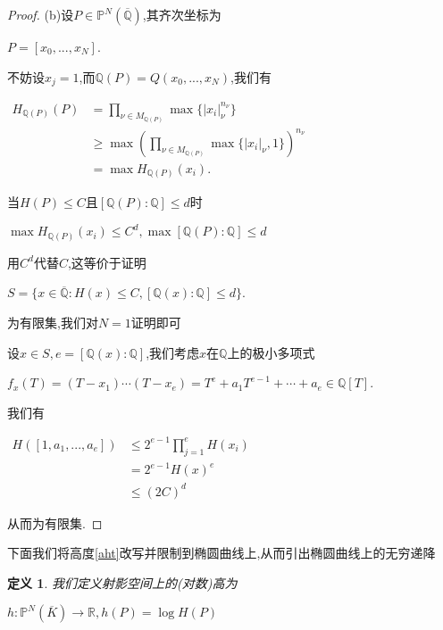 \documentclass[11pt]{ctexart}
\DeclareMathOperator{\Max}{max}
\DeclareMathOperator{\Log}{log}
\newtheorem{defi}{定义}[section]
\begin{document}
\begin{proof}
\noindent (b)设$P \in \mathbb{P}^N(\overline{\mathbb{Q}})$,其齐次坐标为
\begin{center}
    $P=[x_0,...,x_N]$.
\end{center}
不妨设$x_j=1$,而$\mathbb{Q}(P)=Q(x_0,...,x_N)$,我们有
\begin{center}
$\begin{array}{cl}
    H_{\mathbb{Q}(P)}(P)&=\prod\limits_{\nu \in M_{\mathbb{Q}(P)}}\Max \{|x_i|_{\nu}^{n_{\nu}}\}\\

    &\geq\Max (\prod\limits_{\nu \in M_{\mathbb{Q}(P)}}\Max \{|x_i|_{\nu},1\})^{n_{\nu}}\\

    &=\Max H_{\mathbb{Q}(P)}(x_i).
\end{array}$
\end{center}
当$H(P)\leq C$且$[\mathbb{Q}(P):\mathbb{Q}]\leq d$时
\begin{center}
    $\Max H_{\mathbb{Q}(P)}(x_i)\leq C^d$$,\Max  [\mathbb{Q}(P):\mathbb{Q}]\leq d$
\end{center}
用$C^d$代替$C$,这等价于证明
\begin{center}
    $S=\{x\in \overline{\mathbb{Q}}:H(x)\leq C,[\mathbb{Q}(x):\mathbb{Q}]\leq d\}$.
\end{center}
为有限集,我们对$N=1$证明即可
 
设$x\in S,e=[\mathbb{Q}(x):\mathbb{Q}]$,我们考虑$x$在$\mathbb{Q}$上的极小多项式
\begin{center}
    $f_x(T)=(T-x_1)\cdots(T-x_e)=T^e+a_1T^{e-1}+\cdots+a_e \in \mathbb{Q}[T]$.
\end{center}
我们有
\begin{center}
$\begin{array}{cl}
    H([1,a_1,...,a_e])&\leq 2^{e-1}\prod\limits_{j=1}^{e}H(x_i)\\

    &=2^{e-1}H(x)^e\\

    &\leq (2C)^d
\end{array}$
\end{center}
从而为有限集.
\end{proof}

下面我们将高度\ref{aht}改写并限制到椭圆曲线上,从而引出椭圆曲线上的无穷递降

\begin{defi}我们定义射影空间上的(对数)高为
    \begin{center}
        $h:\mathbb{P}^N(\overline{K})\rightarrow \mathbb{R},h(P)=\Log H(P) $
    \end{center}

\end{defi}
\end{document}
